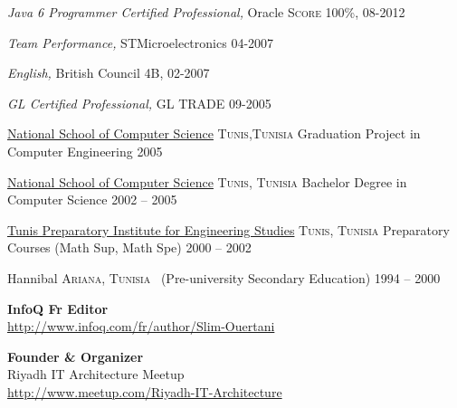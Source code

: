 \documentclass[10pt,a4paper]{article}
\begin{document}
\headedsection
  {{\sl \textit {Java 6 Programmer Certified Professional},} Oracle}
  {\textsc{Score 100\%, 08-2012}} 
  
\headedsection
  {{\sl \textit {Team Performance},} STMicroelectronics}
  {\textsc{04-2007}} 

\headedsection
  {{\sl \textit {English},} British Council}
  {\textsc{4B, 02-2007}} 
  
\headedsection
  {{\sl \textit {GL Certified Professional},} GL TRADE}
  {\textsc{09-2005}} 

\spacedhrule{0em}{-0.4em}



\headedsection
  {\href{http://www.ensi.rnu.tn/}{ National School of Computer Science}}
  {\textsc{Tunis,Tunisia}} {%
  \headedsubsection
    {Graduation Project in Computer Engineering}
    {2005}{}
}

\headedsection
 {\href{http://www.ensi.rnu.tn/}{ National School of Computer Science}}
  {\textsc{Tunis, Tunisia}} {%
  \headedsubsection
    {Bachelor Degree in Computer Science}
    {2002 -- 2005} {}
}



\headedsection
  {\href{http://www.ipeit.rnu.tn/en}{Tunis Preparatory Institute for Engineering Studies}}
  {\textsc{Tunis, Tunisia}} {%
  \headedsubsection
    {Preparatory Courses (Math Sup, Math Spe)}
    {2000 -- 2002} {}
}

\headedsection
  {{Hannibal}}
  {\textsc{Ariana, Tunisia}} {%
  \headedsubsection
    { \textnormal{~(Pre-university Secondary Education)}}
    {1994 -- 2000} {}
}

\spacedhrule{0em}{-0.4em}

\begin{multicols}{2}

{\bf  InfoQ Fr Editor} \\
\url{http://www.infoq.com/fr/author/Slim-Ouertani} 

\columnbreak


{\bf Founder \& Organizer} \\
Riyadh IT Architecture Meetup\\
\url{http://www.meetup.com/Riyadh-IT-Architecture}\\
 


\end{multicols}
\end{document}
